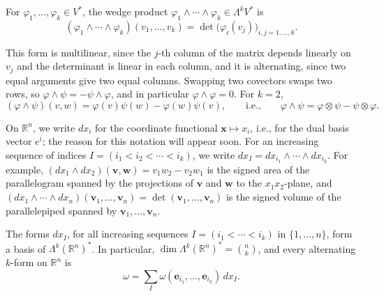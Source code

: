 \begin{definition}\label{A-def:wedge}
    For $\varphi_1, \ldots, \varphi_k \in V^*$, the wedge product $\varphi_1 \wedge \cdots \wedge \varphi_k \in \Lambda^k V^*$ is
    \[(\varphi_1 \wedge \cdots \wedge \varphi_k)(v_1, \ldots, v_k) = \det\big(\varphi_i(v_j)\big)_{i,j = 1, \ldots, k}.\]
\end{definition}

This form is multilinear, since the $j$-th column of the matrix depends linearly on $v_j$ and the determinant is linear in each column, and it is alternating, since two equal arguments give two equal columns. Swapping two covectors swaps two rows, so $\varphi \wedge \psi = -\psi \wedge \varphi$, and in particular $\varphi \wedge \varphi = 0$. For $k = 2$,
\[(\varphi \wedge \psi)(v, w) = \varphi(v)\psi(w) - \varphi(w)\psi(v), \qquad \text{i.e.,} \qquad \varphi \wedge \psi = \varphi \otimes \psi - \psi \otimes \varphi.\]

On $\mathbb{R}^n$, we write $dx_i$ for the coordinate functional $\mathbf{x} \mapsto x_i$, i.e., for the dual basis vector $e^i$; the reason for this notation will appear soon. For an increasing sequence of indices $I = (i_1 < i_2 < \cdots < i_k)$, we write $dx_I = dx_{i_1} \wedge \cdots \wedge dx_{i_k}$. For example, $(dx_1 \wedge dx_2)(\mathbf{v}, \mathbf{w}) = v_1w_2 - v_2w_1$ is the signed area of the parallelogram spanned by the projections of $\mathbf{v}$ and $\mathbf{w}$ to the $x_1x_2$-plane, and $(dx_1 \wedge \cdots \wedge dx_n)(\mathbf{v}_1, \ldots, \mathbf{v}_n) = \det(\mathbf{v}_1, \ldots, \mathbf{v}_n)$ is the signed volume of the parallelepiped spanned by $\mathbf{v}_1, \ldots, \mathbf{v}_n$.

\begin{theorem}\label{A-thm:wedge-basis}
    The forms $dx_I$, for all increasing sequences $I = (i_1 < \cdots < i_k)$ in $\{1, \ldots, n\}$, form a basis of $\Lambda^k(\mathbb{R}^n)^*$. In particular, $\dim \Lambda^k(\mathbb{R}^n)^* = \binom{n}{k}$, and every alternating $k$-form on $\mathbb{R}^n$ is
    \[\omega = \sum_I \omega(\mathbf{e}_{i_1}, \ldots, \mathbf{e}_{i_k})\, dx_I.\]
\end{theorem}

